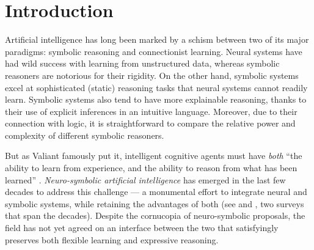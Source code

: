 \documentclass[letterpaper]{article}
\newcommand{\cmark}{\ding{51}}%
\newcommand{\xmark}{\ding{55}}%
\theoremstyle{definition}
\begin{document}
\section{Introduction}

Artificial intelligence  has  long  been  marked  by  a  schism between two of its major paradigms: symbolic reasoning and connectionist learning.  Neural systems have had wild success with learning from unstructured data, whereas symbolic reasoners are notorious for their rigidity.  On the other hand, symbolic systems excel at sophisticated (static) reasoning tasks that neural systems cannot readily learn.  Symbolic systems also tend to have more explainable reasoning, thanks to their use of explicit inferences in an intuitive language.  Moreover, due to their connection with logic, it is straightforward to compare the relative power and complexity of different symbolic reasoners.


But as Valiant famously put it, intelligent cognitive agents must have \emph{both} ``the ability to learn from experience, and the ability to reason from what has been learned'' \cite{valiant2003three}.  \emph{Neuro-symbolic artificial intelligence} has emerged in the last few decades to address this challenge --- a monumental effort to integrate neural and symbolic systems, while retaining the advantages of both (see \cite{bader2005dimensions} and \cite{sarker2021neuro}, two surveys that span the decades).  Despite the cornucopia of neuro-symbolic proposals, the field has not yet agreed on an interface between the two that satisfyingly preserves both flexible learning and expressive reasoning.
\end{document}

